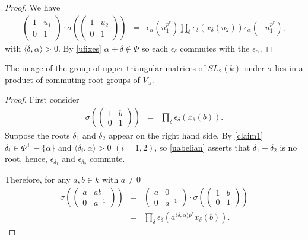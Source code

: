 \begin{proof}
We have
\begin{eqnarray*}
\left(\begin{matrix}1 & u_1 \\ 0 & 1 \end{matrix}\right)
\cdot
\sigma\left(\left(\begin{matrix} 1 & u_2 \\ 0 & 1\end{matrix}\right)\right)
&=&
\epsilon_\alpha(u_1^{p^r}) \prod_\delta \epsilon_\delta\left(x_\delta\left(u_2\right)\right) \epsilon_\alpha(-u_1^{p^r}),
\end{eqnarray*}
with $\langle \delta, \alpha \rangle > 0$. By \ref{ufixes} $\alpha + \delta \notin \Phi$ so each $\epsilon_\delta$ commutes with the $\epsilon_\alpha$.
\end{proof}

\begin{corollary} The image of the group of upper triangular matrices of $SL_2(k)$ under $\sigma$ lies in a product of commuting root groups of $V_\alpha$.
\end{corollary}
\begin{proof}
First consider
\begin{eqnarray*}
\sigma\left(\left( \begin{matrix} 1 & b \\ 0 & 1 \end{matrix}\right)\right) &=& \prod_\delta \epsilon_\delta\left(x_\delta(b)\right).
\end{eqnarray*}
Suppose the roots $\delta_1$ and $\delta_2$ appear on the right hand side. By \ref{claim1} $\delta_i \in \Phi^+ - \{\alpha\}$ and $\langle \delta_i, \alpha \rangle > 0$ $(i=1,2)$, so \ref{uabelian} asserts that $\delta_1 + \delta_2$ is no root, hence, $\epsilon_{\delta_1}$ and $\epsilon_{\delta_2}$ commute. 

Therefore, for any $a, b\in k$ with $a\neq 0$
\begin{eqnarray*}
\sigma\left(\left(\begin{matrix} a & ab \\ 0 & a^{-1}\end{matrix}\right)\right) 
&=& \left(\begin{matrix} a & 0 \\ 0 & a^{-1}\end{matrix} \right) \cdot
\sigma\left(\left(\begin{matrix} 1 & b \\ 0 & 1\end{matrix}\right)\right) \\
&=& \prod_\delta \epsilon_\delta\left(a^{\langle \delta, \alpha \rangle p^r}x_\delta\left(b\right)\right).
\end{eqnarray*}
\end{proof}

